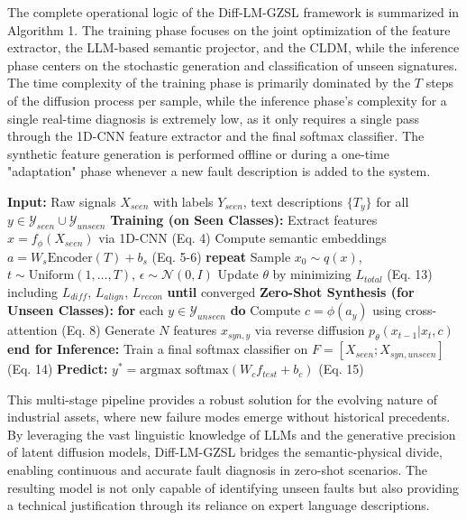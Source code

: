 The complete operational logic of the Diff-LM-GZSL framework is summarized in Algorithm 1. The training phase focuses on the joint optimization of the feature extractor, the LLM-based semantic projector, and the CLDM, while the inference phase centers on the stochastic generation and classification of unseen signatures. The time complexity of the training phase is primarily dominated by the $T$ steps of the diffusion process per sample, while the inference phase's complexity for a single real-time diagnosis is extremely low, as it only requires a single pass through the 1D-CNN feature extractor and the final softmax classifier. The synthetic feature generation is performed offline or during a one-time "adaptation" phase whenever a new fault description is added to the system.

\begin{algorithm}
\caption{Diff-LM-GZSL: Training and Inference}
\begin{algorithmic}[1]
\State \textbf{Input:} Raw signals $X_{seen}$ with labels $Y_{seen}$, text descriptions $\{T_y\}$ for all $y \in \mathcal{Y}_{seen} \cup \mathcal{Y}_{unseen}$
\State \textbf{Training (on Seen Classes):}
\State \quad Extract features $x = f_\phi(X_{seen})$ via 1D-CNN (Eq. 4)
\State \quad Compute semantic embeddings $a = W_s \text{Encoder}(T) + b_s$ (Eq. 5-6)
\State \quad \textbf{repeat}
\State \quad \quad Sample $x_0 \sim q(x)$, $t \sim \text{Uniform}(1, \dots, T)$, $\epsilon \sim \mathcal{N}(0, I)$
\State \quad \quad Update $\theta$ by minimizing $L_{total}$ (Eq. 13) including $L_{diff}$, $L_{align}$, $L_{recon}$
\State \quad \textbf{until} converged
\State \textbf{Zero-Shot Synthesis (for Unseen Classes):}
\State \quad \textbf{for} each $y \in \mathcal{Y}_{unseen}$ \textbf{do}
\State \quad \quad Compute $c = \phi(a_y)$ using cross-attention (Eq. 8)
\State \quad \quad Generate $N$ features $x_{syn, y}$ via reverse diffusion $p_\theta(x_{t-1}|x_t, c)$
\State \quad \textbf{end for}
\State \textbf{Inference:}
\State \quad Train a final softmax classifier on $F = [X_{seen}; X_{syn, unseen}]$ (Eq. 14)
\State \quad \textbf{Predict:} $y^* = \text{argmax } \text{softmax}(W_c f_{test} + b_c)$ (Eq. 15)
\end{algorithmic}
\end{algorithm}

This multi-stage pipeline provides a robust solution for the evolving nature of industrial assets, where new failure modes emerge without historical precedents. By leveraging the vast linguistic knowledge of LLMs and the generative precision of latent diffusion models, Diff-LM-GZSL bridges the semantic-physical divide, enabling continuous and accurate fault diagnosis in zero-shot scenarios. The resulting model is not only capable of identifying unseen faults but also providing a technical justification through its reliance on expert language descriptions.
